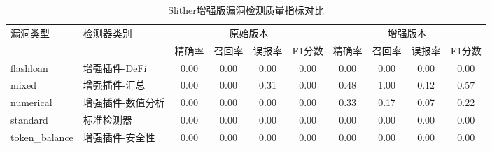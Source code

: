 \begin{table}[h]
\centering
\caption{Slither增强版漏洞检测质量指标对比}
\label{tab:detection_quality}
\begin{tabular}{llcccccccc}
\toprule
\multirow{2}{*}{漏洞类型} & \multirow{2}{*}{检测器类别} & \multicolumn{4}{c}{原始版本} & \multicolumn{4}{c}{增强版本} \\
\cmidrule(lr){3-6} \cmidrule(lr){7-10}
& & 精确率 & 召回率 & 误报率 & F1分数 & 精确率 & 召回率 & 误报率 & F1分数 \\
\midrule
flashloan & 增强插件-DeFi & 0.00 & 0.00 & 0.00 & 0.00 & 0.00 & 0.00 & 0.00 & 0.00 \\
mixed & 增强插件-汇总 & 0.00 & 0.00 & 0.31 & 0.00 & 0.48 & 1.00 & 0.12 & 0.57 \\
numerical & 增强插件-数值分析 & 0.00 & 0.00 & 0.00 & 0.00 & 0.33 & 0.17 & 0.07 & 0.22 \\
standard & 标准检测器 & 0.00 & 0.00 & 0.00 & 0.00 & 0.00 & 0.00 & 0.00 & 0.00 \\
token_balance & 增强插件-安全性 & 0.00 & 0.00 & 0.00 & 0.00 & 0.00 & 0.00 & 0.00 & 0.00 \\
\bottomrule
\end{tabular}
\end{table}